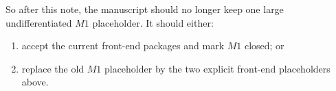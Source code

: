 \documentclass[11pt]{article}
\begin{document}
So after this note, the manuscript should no longer keep one large
undifferentiated $M1$ placeholder.
It should either:
\begin{enumerate}[label=\textup{(\alph*)},leftmargin=2.5em]
\item accept the current front-end packages and mark $M1$ closed; or
\item replace the old $M1$ placeholder by the two explicit front-end
      placeholders above.
\end{enumerate}
\end{document}
